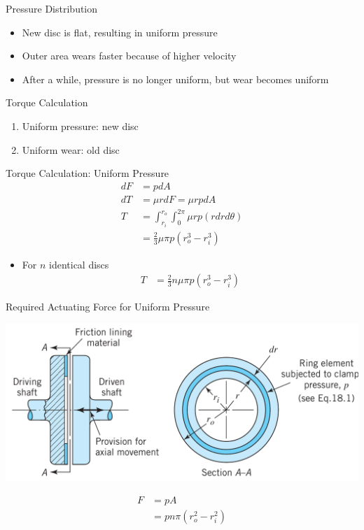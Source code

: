 \documentclass[10pt, svgnames]{beamer}
\begin{document}
\begin{frame}[label={sec:org2145167}]{Pressure Distribution}
\begin{itemize}
\item New disc is flat, resulting in uniform pressure
\item Outer area wears faster because of higher velocity
\item After a while, pressure is no longer uniform, but wear becomes uniform
\end{itemize}
\end{frame}

\begin{frame}[label={sec:org883ff3f}]{Torque Calculation}
\begin{enumerate}
\item Uniform pressure: new disc
\item Uniform wear: old disc
\end{enumerate}
\end{frame}

\begin{frame}[label={sec:orgbe74e12}]{Torque Calculation: Uniform Pressure}
\begin{align*}
    dF &= p dA \\
    dT &= \mu rdF = \mu r p dA \\
    T &= \int_{r_i}^{r_o} \int_0^{2\pi} \mu r p (rdrd\theta) \\
        &= \frac{2}{3} \mu \pi p \left( r_o^3 - r_i^3 \right)
\end{align*}

\begin{itemize}
\item For \(n\) identical discs
\begin{align*}
T &= \frac{2}{3} n \mu \pi p \left( r_o^3 - r_i^3 \right)
\end{align*}
\end{itemize}
\end{frame}

\begin{frame}[label={sec:orgd5d1869}]{Required Actuating Force for Uniform Pressure}
\begin{center}
\includegraphics[width=.9\linewidth]{./pictures/disc-brake-components.png}
\end{center}

\begin{align*}
  F &= pA \\
  &= p n \pi \left( r_{o}^{2} - r_{i}^{2} \right)
\end{align*}
\end{frame}
\end{document}

